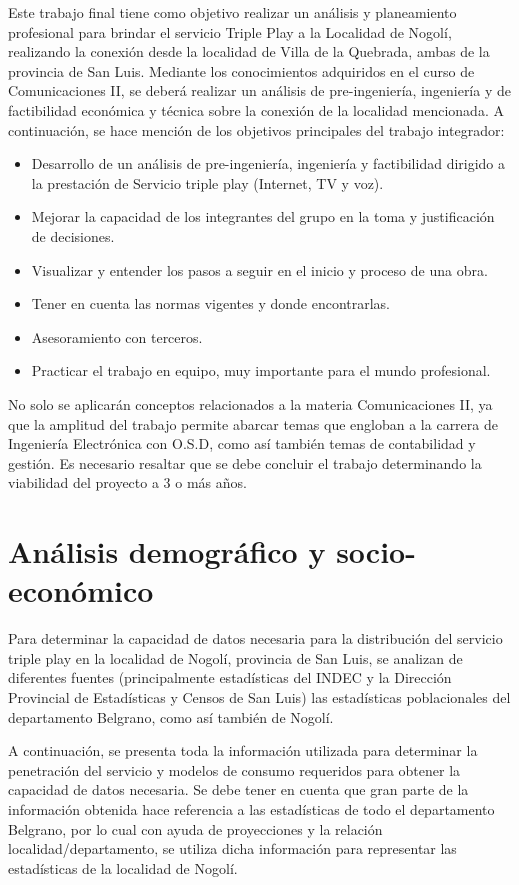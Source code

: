 \documentclass[12pt,a4paper]{book}
\begin{document}
Este trabajo final tiene como objetivo realizar un análisis y planeamiento profesional para brindar el servicio Triple Play a la Localidad de Nogolí, realizando la conexión desde la localidad de Villa de la Quebrada, ambas de la provincia de San Luis.  Mediante los conocimientos adquiridos en el curso de Comunicaciones II, se deberá realizar un análisis de pre-ingeniería, ingeniería y de factibilidad económica y técnica sobre la conexión de la localidad mencionada. A continuación, se hace mención de los objetivos principales del trabajo integrador:

\begin{itemize}
\item Desarrollo de un análisis de pre-ingeniería, ingeniería y factibilidad dirigido a la prestación de Servicio triple play (Internet, TV y voz).
\item Mejorar la capacidad de los integrantes del grupo en la toma y justificación de decisiones.
\item Visualizar y entender los pasos a seguir en el inicio y proceso de una obra.
\item Tener en cuenta las normas vigentes y donde encontrarlas.
\item Asesoramiento con terceros.
\item Practicar el trabajo en equipo, muy importante para el mundo profesional.
\end{itemize}

No solo se aplicarán conceptos relacionados a la materia Comunicaciones II, ya que la amplitud del trabajo permite abarcar temas que engloban a la carrera de Ingeniería Electrónica con O.S.D, como así también temas de contabilidad y gestión. Es necesario resaltar que se debe concluir el trabajo determinando la viabilidad del proyecto a 3 o más años.


\chapter{Análisis demográfico y socio-económico}\label{cap_demografico}

Para determinar la capacidad de datos necesaria para la distribución del servicio triple play en la localidad de Nogolí, provincia de San Luis, se analizan de diferentes fuentes (principalmente estadísticas del INDEC y la Dirección Provincial de Estadísticas y Censos de San Luis) las estadísticas poblacionales del departamento Belgrano, como así también de Nogolí. 

A continuación, se presenta toda la información utilizada para determinar la penetración del servicio y modelos de consumo requeridos para obtener la capacidad de datos necesaria. Se debe tener en cuenta que gran parte de la información obtenida hace referencia a las estadísticas de todo el departamento Belgrano, por lo cual con ayuda de proyecciones y la relación localidad/departamento, se utiliza dicha información para representar las estadísticas de la localidad de Nogolí.
\end{document}
